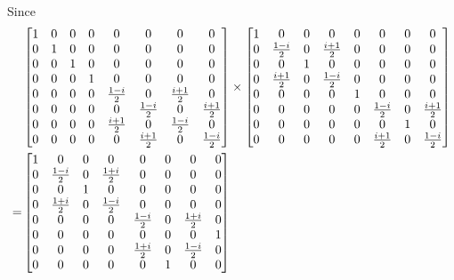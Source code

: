 \documentclass[en]{sol-man}
\begin{document}
\begin{sol}
\begin{itemize}
\begin{pf}
\begin{align}
            \end{align}
            Since
            \begin{align}
                \notag&\begin{bmatrix}
                    1&0&0&0&0&0&0&0\\
                    0&1&0&0&0&0&0&0\\
                    0&0&1&0&0&0&0&0\\
                    0&0&0&1&0&0&0&0\\
                    0&0&0&0&\frac{1-i}{2}&0&\frac{i+1}{2}&0\\
                    0&0&0&0&0&\frac{1-i}{2}&0&\frac{i+1}{2}\\
                    0&0&0&0&\frac{i+1}{2}&0&\frac{1-i}{2}&0\\
                    0&0&0&0&0&\frac{i+1}{2}&0&\frac{1-i}{2}
                \end{bmatrix}\times\begin{bmatrix}
                    1&0&0&0&0&0&0&0\\
                    0&\frac{1-i}{2}&0&\frac{i+1}{2}&0&0&0&0\\
                    0&0&1&0&0&0&0&0\\
                    0&\frac{i+1}{2}&0&\frac{1-i}{2}&0&0&0&0\\
                    0&0&0&0&1&0&0&0\\
                    0&0&0&0&0&\frac{1-i}{2}&0&\frac{i+1}{2}\\
                    0&0&0&0&0&0&1&0\\
                    0&0&0&0&0&\frac{i+1}{2}&0&\frac{1-i}{2}
                \end{bmatrix}\\
                \notag=&\begin{bmatrix}
                    1&0&0&0&0&0&0&0\\
                    0&\frac{1-i}{2}&0&\frac{1+i}{2}&0&0&0&0\\
                    0&0&1&0&0&0&0&0\\
                    0&\frac{1+i}{2}&0&\frac{1-i}{2}&0&0&0&0\\
                    0&0&0&0&\frac{1-i}{2}&0&\frac{1+i}{2}&0\\
                    0&0&0&0&0&0&0&1\\
                    0&0&0&0&\frac{1+i}{2}&0&\frac{1-i}{2}&0\\
                    0&0&0&0&0&1&0&0
                \end{bmatrix}\\

\end{align}
\end{pf}
\end{itemize}
\end{sol}
\end{document}
